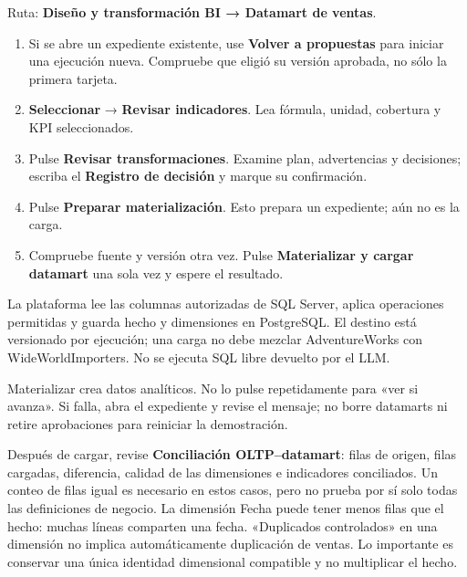 Ruta: \textbf{Diseño y transformación BI → Datamart de ventas}.
\begin{enumerate}
\item Si se abre un expediente existente, use \textbf{Volver a propuestas} para iniciar una ejecución nueva. Compruebe que eligió su versión aprobada, no sólo la primera tarjeta.
\item \textbf{Seleccionar} → \textbf{Revisar indicadores}. Lea fórmula, unidad, cobertura y KPI seleccionados.
\item Pulse \textbf{Revisar transformaciones}. Examine plan, advertencias y decisiones; escriba el \textbf{Registro de decisión} y marque su confirmación.
\item Pulse \textbf{Preparar materialización}. Esto prepara un expediente; aún no es la carga.
\item Compruebe fuente y versión otra vez. Pulse \textbf{Materializar y cargar datamart} una sola vez y espere el resultado.
\end{enumerate}
La plataforma lee las columnas autorizadas de SQL Server, aplica operaciones permitidas y guarda hecho y dimensiones en PostgreSQL. El destino está versionado por ejecución; una carga no debe mezclar AdventureWorks con WideWorldImporters. No se ejecuta SQL libre devuelto por el LLM.
\begin{note}
Materializar crea datos analíticos. No lo pulse repetidamente para «ver si avanza». Si falla, abra el expediente y revise el mensaje; no borre datamarts ni retire aprobaciones para reiniciar la demostración.
\end{note}

Después de cargar, revise \textbf{Conciliación OLTP--datamart}: filas de origen, filas cargadas, diferencia, calidad de las dimensiones e indicadores conciliados. Un conteo de filas igual es necesario en estos casos, pero no prueba por sí solo todas las definiciones de negocio.
La dimensión Fecha puede tener menos filas que el hecho: muchas líneas comparten una fecha. «Duplicados controlados» en una dimensión no implica automáticamente duplicación de ventas. Lo importante es conservar una única identidad dimensional compatible y no multiplicar el hecho.

